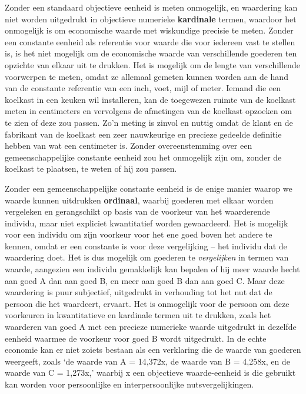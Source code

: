 \documentclass[
  a5paper,
  smalldemyvopaper,11pt,twoside,onecolumn,openright,extrafontsizes,
hidelinks]{memoir}
\begin{document}
Zonder een standaard objectieve eenheid is meten onmogelijk, en
waardering kan niet worden uitgedrukt in objectieve numerieke
\textbf{kardinale} termen, waardoor het onmogelijk is om economische
waarde met wiskundige precisie te meten. Zonder een constante eenheid
als referentie voor waarde die voor iedereen vast te stellen is, is het
niet mogelijk om de economische waarde van verschillende goederen ten
opzichte van elkaar uit te drukken. Het is mogelijk om de lengte van
verschillende voorwerpen te meten, omdat ze allemaal gemeten kunnen
worden aan de hand van de constante referentie van een inch, voet, mijl
of meter. Iemand die een koelkast in een keuken wil installeren, kan de
toegewezen ruimte van de koelkast meten in centimeters en vervolgens de
afmetingen van de koelkast opzoeken om te zien of deze zou passen. Zo'n
meting is zinvol en nuttig omdat de klant en de fabrikant van de
koelkast een zeer nauwkeurige en precieze gedeelde definitie hebben van
wat een centimeter is. Zonder overeenstemming over een
gemeenschappelijke constante eenheid zou het onmogelijk zijn om, zonder
de koelkast te plaatsen, te weten of hij zou passen.

Zonder een gemeenschappelijke constante eenheid is de enige manier
waarop we waarde kunnen uitdrukken \textbf{ordinaal}, waarbij goederen
met elkaar worden vergeleken en gerangschikt op basis van de voorkeur
van het waarderende individu, maar niet expliciet kwantitatief worden
gewaardeerd. Het is mogelijk voor een individu om zijn voorkeur voor het
ene goed boven het andere te kennen, omdat er een constante is voor deze
vergelijking -- het individu dat de waardering doet. Het is dus mogelijk
om goederen te \emph{vergelijken} in termen van waarde, aangezien een
individu gemakkelijk kan bepalen of hij meer waarde hecht aan goed A dan
aan goed B, en meer aan goed B dan aan goed C. Maar deze waardering is
puur subjectief, uitgedrukt in verhouding tot het nut dat de persoon die
het waardeert, ervaart. Het is onmogelijk voor de persoon om deze
voorkeuren in kwantitatieve en kardinale termen uit te drukken, zoals
het waarderen van goed A met een precieze numerieke waarde uitgedrukt in
dezelfde eenheid waarmee de voorkeur voor goed B wordt uitgedrukt. In de
echte economie kan er niet zoiets bestaan als een verklaring die de
waarde van goederen weergeeft, zoals `de waarde van A = 14,372x, de
waarde van B = 4,258x, en de waarde van C = 1,273x,' waarbij x een
objectieve waarde-eenheid is die gebruikt kan worden voor persoonlijke
en interpersoonlijke nutsvergelijkingen.
\end{document}
